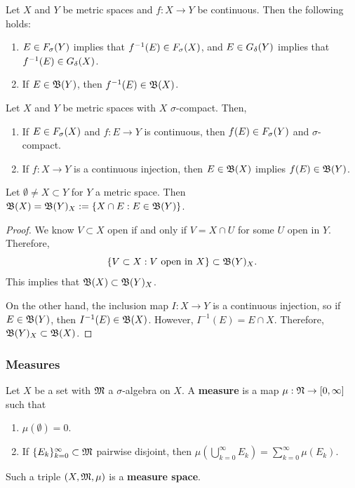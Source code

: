 \documentclass[a4paper]{article}
\renewcommand{\cupinfk}{\bigcup_{k=0}^\infty}
\renewcommand{\suminfk}{\sum_{k=0}^\infty}
\renewcommand{\seqinfk}[1]{\{ #1 \}_{k=0}^\infty}
\begin{document}
\begin{thm}
  Let $X$ and $Y$ be metric spaces and $f: X \to Y$ be continuous. Then
  the following holds:
  \begin{enumerate}
    \item $E \in F_\sigma(Y)$ implies that $f^{-1}(E) \in F_\sigma(X)$,
          and $E \in G_\delta(Y)$ implies that $f^{-1}(E) \in G_\delta(X)$.

    \item If $E \in \mathfrak{B}(Y)$, then $f^{-1}(E) \in \mathfrak{B}(X)$.
  \end{enumerate}
\end{thm}

\begin{thm}
  Let $X$ and $Y$ be metric spaces with $X$ $\sigma$-compact. Then,
  \begin{enumerate}
    \item If $E \in F_\sigma(X)$ and $f : E \to Y$ is continuous, then $f(E)
          \in F_\sigma(Y)$ and $\sigma$-compact.

    \item If $f: X \to Y$ is a continuous injection, then $E \in \mathfrak{B}(X)$
          implies $f(E) \in \mathfrak{B}(Y)$.
  \end{enumerate}
\end{thm}

\begin{cor}
  Let $\emptyset \neq X \subset Y$ for $Y$ a metric space.
  Then $\mathfrak{B}(X) = \mathfrak{B}(Y)_X := \left\{ X \cap E: E \in
    \mathfrak{B}(Y) \right\}$.
\end{cor}

\begin{proof}
  We know $V \subset X$ open if and only if $V = X \cap U$ for some $U$
  open in $Y$. Therefore,
  \[
    \left\{ V \subset X: \text{$V$ open in $X$}
    \right\} \subset \mathfrak{B}(Y)_X.
  \]
  This implies that $\mathfrak{B}(X) \subset \mathfrak{B}(Y)_X$.

  On the other hand, the inclusion map $I: X \to Y$ is a continuous
  injection, so if $E \in \mathfrak{B}(Y)$, then $I^{-1}(E) \in \mathfrak{B}(X)$. However,
  $I^{-1}(E) = E \cap X$. Therefore, $\mathfrak{B}(Y)_X \subset \mathfrak{B}(X)$.

\end{proof}

\subsubsection{Measures}

\begin{defi}[Measure]
  Let $X$ be a set with $\mathfrak{M}$ a $\sigma$-algebra on $X$.
  A \textbf{measure} is a map $\mu: \mathfrak{N} \to [0, \infty]$
  such that
  \begin{enumerate}
    \item $\mu(\emptyset) = 0$.
    \item If $\seqinfk{E_k} \subset \mf$ pairwise disjoint, then $\mu
          \left( \cupinfk E_k \right) = \suminfk \mu (E_k)$.
  \end{enumerate}
  Such a triple $(X, \mathfrak{M}, \mu)$ is a \textbf{measure
    space}.
\end{defi}
\end{document}
